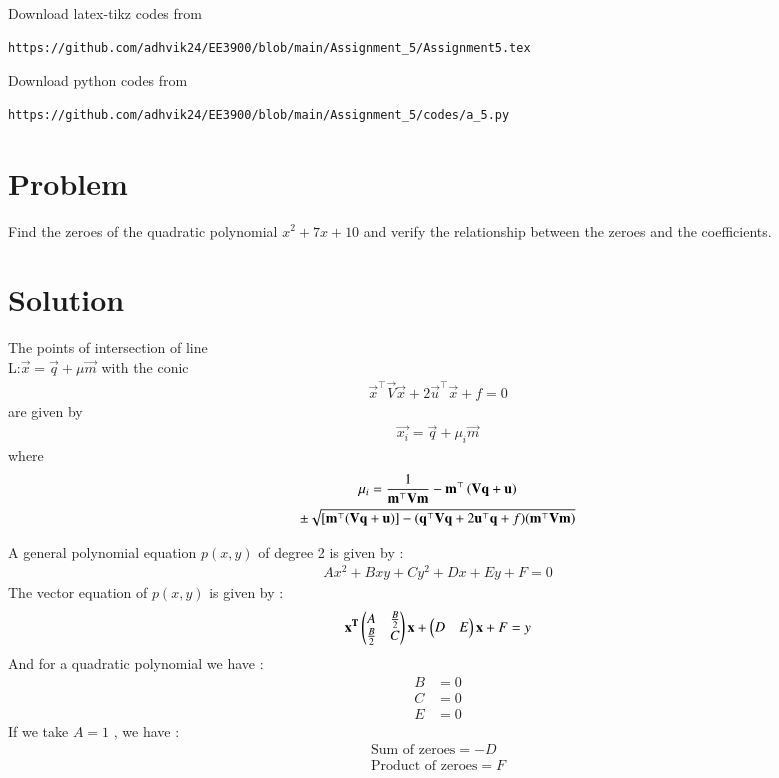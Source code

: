\documentclass[journal,12pt,twocolumn]{IEEEtran}
\begin{document}
Download latex-tikz codes from 
%
\begin{lstlisting}
https://github.com/adhvik24/EE3900/blob/main/Assignment_5/Assignment5.tex
\end{lstlisting}
%
Download python codes from 
%
\begin{lstlisting}
https://github.com/adhvik24/EE3900/blob/main/Assignment_5/codes/a_5.py
\end{lstlisting}
\section{Problem}
Find the zeroes of the quadratic polynomial
$x^2+7x+10$ and verify the relationship between
the zeroes and the coefficients.
\section{Solution}
\begin{lemma}\label{l1}
The points of intersection of line \\L:$\vec{x}=\vec{q}+\mu \vec{m}$ with the conic 
\begin{align}
\vec{x}^\top\vec{V}\vec{x}+2\vec{u}^\top\vec{x}+f=0
\end{align}
are given by 
\begin{align}  
\vec{x_{i}}=\vec{q}+\mu_{i}\vec{m}
\end{align}
where 
\begin{multline}
    \mu_i=\frac{1}{\mathbf{m}^\top\mathbf{V}\mathbf{m}}-\mathbf{m}^\top\left(\mathbf{V}\mathbf{q}+\mathbf{u}\right)\\ \pm\sqrt{[\mathbf{m}^\top(\mathbf{V}\mathbf{q}+\mathbf{u})]-(\mathbf{q}^\top\mathbf{V}\mathbf{q}+2\mathbf{u}^\top\mathbf{q}+f)(\mathbf{m}^\top\mathbf{V}\mathbf{m})}
\end{multline}

\end{lemma}

\begin{lemma}
A general polynomial equation $p(x,y)$ of degree 2 is given by :
\begin{align}
Ax^2 + Bxy + Cy^2 + Dx + Ey + F = 0
\end{align}
The vector equation of $p(x,y)$ is given by :
\begin{align}
\mathbf{x^T}\begin{pmatrix}A & \frac{B}{2} \\ \frac{B}{2} & C\end{pmatrix}\mathbf{x} + \begin{pmatrix}D & E\end{pmatrix}\mathbf{x} + F=y\label{eq:1}
\end{align}
And for a quadratic polynomial we have :
\begin{align}
B &= 0\\
C &= 0\\
E &= 0
\end{align}
If we take $A = 1$ , we have :
\begin{align}
\text{Sum of zeroes} = -D \\
\text{Product of zeroes} = F 
\end{align}

\end{lemma}
\end{document}
